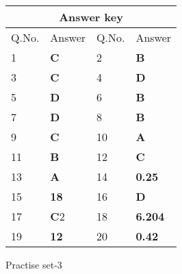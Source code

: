 \begin{table}[H]
\centering
{}
\begin{tabular}{|p{1.5cm}|p{1.5cm}||p{1.5cm}|p{1.5cm}|}
	\hline
	\multicolumn{4}{|c|}{\textbf{Answer key}}\\\hline\hline
	\rowcolor{ocrel}Q.No.&Answer&Q.No.&Answer\\\hline
	1&\textbf{C} &2&\textbf{B}\\\hline
	3&\textbf{C} &4&\textbf{D} \\\hline
	5&\textbf{D} &6&\textbf{B} \\\hline
	7&\textbf{D}&8&\textbf{B}\\\hline
	9&\textbf{C}&10&\textbf{A}\\\hline
	11&\textbf{B} &12&\textbf{C}\\\hline
	13&\textbf{A}&14&\textbf{0.25}\\\hline
	15&\textbf{18}&16 &\textbf{D}\\\hline
	17&\textbf{C}2&18&\textbf{6.204}\\\hline
	19&\textbf{12}&20&\textbf{0.42}\\\hline
	
\end{tabular}
\end{table}	
\newpage
\begin{abox}
	Practise set-3
\end{abox}
